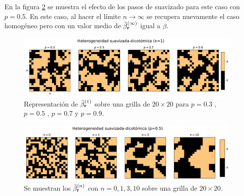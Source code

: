En la figura \ref{fig:smoth_dic_step} se muestra el efecto de los pasos de suavizado para este caso con $p=0.5$. En este caso, al hacer el límite 
$n\to \infty$ se recupera nuevamente el caso homogéneo pero con un valor medio de $\tilde{\beta}^{(\infty)}_{\vb r}$ igual a $\beta$.
\begin{figure}[h]
  \centering
  \includegraphics[width=.9\textwidth]{het_suav_dico.pdf}
  \caption{Representación de $\tilde{\beta}^{(1)}_{\vb r}$ sobre una grilla de $20 \times 20$ para  $p=0.3$ , $p=0.5$ , $p=0.7$ y $p=0.9$.}
  \label{fig:smoth_dic}  
\end{figure}
\begin{figure}[h]
  \centering
  \includegraphics[width=.9\textwidth]{nsmoth_dic_step.pdf}
  \caption{Se muestran los $\tilde{\beta}^{(n)}_{\vb r}$ con $n=0,1,3,10$ sobre una grilla de $20\times20$.}
  \label{fig:smoth_dic_step}
\end{figure}







